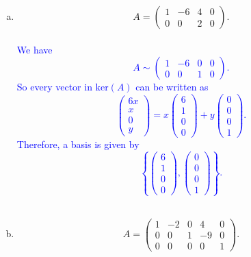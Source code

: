\documentclass[a4paper,11pt]{article}
\newcommand{\blue}[1]{\textcolor{blue}{#1}}
\begin{document}
\begin{enumerate}[(a)]
\item
  \[
    A =
    \left(
      \begin{array}{rrrr}
        1 & -6 & 4 & 0 \\ 0 & 0 & 2 & 0
      \end{array}
    \right).
  \] \\

  \blue{We have
    \[
      A \sim
      \left(
        \begin{array}{rrrr}
          1 & -6 & 0 & 0 \\ 0 & 0 & 1 & 0
        \end{array}
      \right).
    \]
    So every vector in $\text{ker}(A)$ can be written as
    \[
      \left(
        \begin{array}{c}
          6x \\ x \\ 0 \\ y
        \end{array}
      \right)
      =x
      \left(
        \begin{array}{r}
          6 \\ 1 \\ 0 \\ 0
        \end{array}
      \right)
      +y
      \left(
        \begin{array}{r}
          0 \\ 0 \\ 0 \\ 1
        \end{array}
      \right).
    \]
    Therefore, a basis is given by
    \[
      \left\{
        \left(
          \begin{array}{r}
            6 \\ 1 \\ 0 \\ 0
          \end{array}
        \right),
        \left(
          \begin{array}{r}
            0 \\ 0 \\ 0 \\ 1
          \end{array}
        \right)
      \right\}.
    \] \\}
  
\item
  \[
    A =
    \left(
      \begin{array}{rrrrr}
        1 & -2 & 0 & 4 & 0 \\
        0 & 0 & 1 & -9 & 0 \\
        0 & 0 & 0 & 0 & 1
      \end{array}
    \right).
  \] \\


\end{enumerate}
\end{document}
